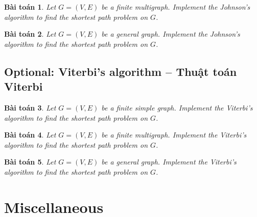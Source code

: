 \documentclass{article}
\newtheorem{baitoan}{Bài toán}
\begin{document}
\begin{baitoan}
    Let $G = (V,E)$ be a finite multigraph. Implement the Johnson's algorithm to find the shortest path problem on $G$.
\end{baitoan}

\begin{baitoan}
    Let $G = (V,E)$ be a general graph. Implement the Johnson's algorithm to find the shortest path problem on $G$.
\end{baitoan}


\subsection{Optional: Viterbi's algorithm -- Thuật toán Viterbi}

\begin{baitoan}
    Let $G = (V,E)$ be a finite simple graph. Implement the Viterbi's algorithm to find the shortest path problem on $G$.
\end{baitoan}

\begin{baitoan}
    Let $G = (V,E)$ be a finite multigraph. Implement the Viterbi's algorithm to find the shortest path problem on $G$.
\end{baitoan}

\begin{baitoan}
    Let $G = (V,E)$ be a general graph. Implement the Viterbi's algorithm to find the shortest path problem on $G$.
\end{baitoan}


\section{Miscellaneous}


\printbibliography[heading=bibintoc]
    
\end{document}
